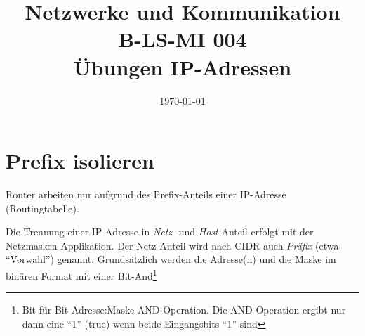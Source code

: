 \documentclass[a4paper,german]{scrartcl}
\title{Netzwerke und Kommunikation\\B-LS-MI 004\\\"Ubungen IP-Adressen}
\date{\today}
\begin{document}
\maketitle

\section{Prefix isolieren}
Router arbeiten nur aufgrund des Prefix-Anteils einer IP-Adresse (Routingtabelle).

Die Trennung einer IP-Adresse in \emph{Netz-} und \emph{Host}-Anteil erfolgt mit der Netzmasken-Applikation.
Der Netz-Anteil wird nach CIDR auch \emph{Pr\"afix} (etwa ``Vorwahl'') genannt. Grunds\"atzlich werden die Adresse(n) und die Maske im bin\"aren Format mit einer Bit-And\footnote{Bit-f\"ur-Bit Adresse:Maske AND-Operation. Die AND-Operation ergibt nur dann eine ``1'' (true) wenn beide Eingangsbits ``1'' sind}
\end{document}
